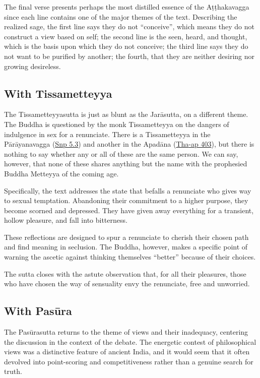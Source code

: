 \documentclass[12pt,openany]{book}%
\begin{document}
The final verse presents perhaps the most distilled essence of the \textsanskrit{Aṭṭhakavagga} since each line contains one of the major themes of the text. Describing the realized sage, the first line says they do not “conceive”, which means they do not construct a view based on self; the second line is the seen, heard, and thought, which is the basis upon which they do not conceive; the third line says they do not want to be purified by another; the fourth, that they are neither desiring nor growing desireless.

\subsection*{With Tissametteyya}

The Tissametteyyasutta is just as blunt as the \textsanskrit{Jarāsutta}, on a different theme. The Buddha is questioned by the monk Tissametteyya on the dangers of indulgence in sex for a renunciate. There is a Tissametteyya in the \textsanskrit{Pārāyanavagga} (\href{https://suttacentral.net/snp5.3/en/sujato}{Snp 5.3}) and another in the \textsanskrit{Apadāna} (\href{https://suttacentral.net/tha{-}ap402}{Tha{-}ap 403}), but there is nothing to say whether any or all of these are the same person. We can say, however, that none of these shares anything but the name with the prophesied Buddha Metteyya of the coming age.

Specifically, the text addresses the state that befalls a renunciate who gives way to sexual temptation. Abandoning their commitment to a higher purpose, they become scorned and depressed. They have given away everything for a transient, hollow pleasure, and fall into bitterness.

These reflections are designed to spur a renunciate to cherish their chosen path and find meaning in seclusion. The Buddha, however, makes a specific point of warning the ascetic against thinking themselves “better” because of their choices.

The sutta closes with the astute observation that, for all their pleasures, those who have chosen the way of sensuality envy the renunciate, free and unworried.

\subsection*{With \textsanskrit{Pasūra}}

The \textsanskrit{Pasūrasutta} returns to the theme of views and their inadequacy, centering the discussion in the context of the debate. The energetic contest of philosophical views was a distinctive feature of ancient India, and it would seem that it often devolved into point-scoring and competitiveness rather than a genuine search for truth.
\end{document}
